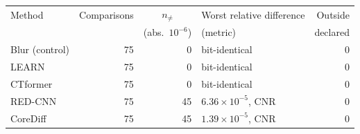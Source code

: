 \begin{tabular}{lrrlr}
\toprule
Method & Comparisons & \multicolumn{1}{c}{$n_{\ne}$} & Worst relative difference & Outside \\
       &             & \multicolumn{1}{c}{(abs.\ $10^{-6}$)} & (metric)              & declared \\
\midrule
Blur (control) & 75 & 0 & bit-identical & 0 \\
LEARN & 75 & 0 & bit-identical & 0 \\
CTformer & 75 & 0 & bit-identical & 0 \\
RED-CNN & 75 & 45 & $6.36 \times 10^{-5}$, CNR & 0 \\
CoreDiff & 75 & 45 & $1.39 \times 10^{-5}$, CNR & 0 \\
\bottomrule
\end{tabular}
